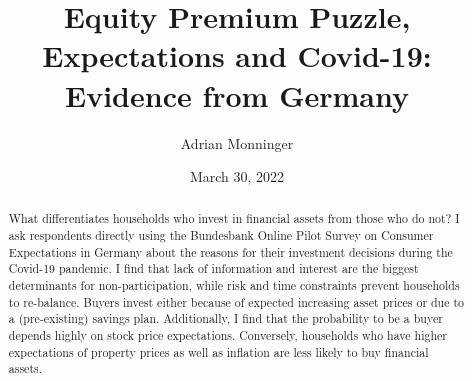 \documentclass[ProjectABM]{subfiles}
\begin{document}
\providecommand{\versn}{pdf} %
\ifthenelse{\boolean{Web}}{    %
  \renewcommand{\versn}{Web}     %
  \renewcommand{\rootFromOut}{.} %
}{}  %


\title{Equity Premium Puzzle, Expectations and Covid-19:\\ Evidence from Germany}

\author{Adrian Monninger\authNum}




\renewcommand{\forcedate}{March 30, 2022}\date{\forcedate}

\maketitle
\hypertarget{abstract}{}
\begin{abstract}
	What differentiates households who invest in financial assets from those who do not? I ask respondents directly using the Bundesbank Online Pilot Survey on Consumer Expectations in Germany about the reasons for their investment decisions during the Covid-19 pandemic. I find that lack of information and interest are the biggest determinants for non-participation, while risk and time constraints prevent households to re-balance. Buyers invest either because of expected increasing asset prices or due to a (pre-existing) savings plan. Additionally, I find that the probability to be a buyer depends highly on stock price expectations. Conversely, households who have higher expectations of property prices as well as inflation are less likely to buy financial assets.
\end{abstract}
\end{document}
